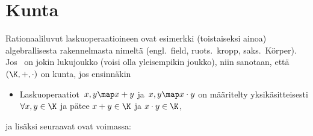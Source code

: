 \section{Kunta} \label{kunta}
\alku

Rationaaliluvut laskuoperaatioineen ovat esimerkki (toistaiseksi ainoa) algebrallisesta
rakennelmasta nimeltä  (engl.\ field, ruots.\ kropp, saks.\ Körper). Jos \K\ on jokin
lukujoukko (voisi olla yleisempikin joukko), niin sanotaan, että $(\K,+,\cdot )$ on kunta, jos
ensinnäkin
% 
\begin{itemize}
\item Laskuoperaatiot $\,x,y \map x+y$ ja $\,x,y \map x \cdot y$ on määritelty yksikäsitteisesti
$\forall x,y \in \K$ ja pätee $x+y \in \K$ ja $x \cdot y \in \K$,
\end{itemize}
ja lisäksi seuraavat  ovat voimassa:
%
